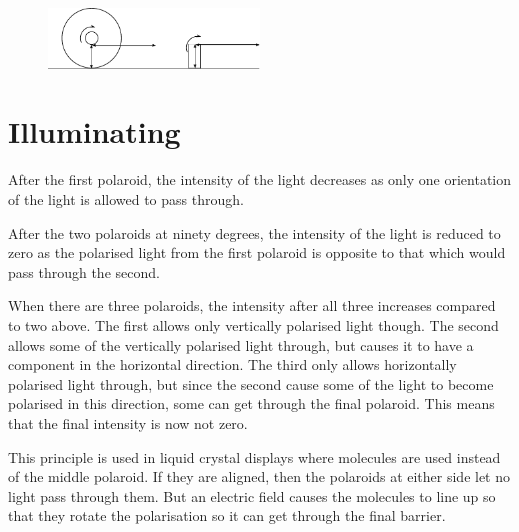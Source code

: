 	\begin{figure}[ht]
		\centering
		\includegraphics[width=0.5\textwidth]{drums_rolling_answer.pdf}
	\end{figure}

\section{Illuminating} %
	\label{sec:illuminating_ans}
	After the first polaroid, the intensity of the light decreases as only one orientation of the light is allowed to pass through.

	After the two polaroids at ninety degrees, the intensity of the light is reduced to zero as the polarised light from the first polaroid is opposite to that which would pass through the second.

	When there are three polaroids, the intensity after all three increases compared to two above. The first allows only vertically polarised light though. The second allows some of the vertically polarised light through, but causes it to have a component in the horizontal direction. The third only allows horizontally polarised light through, but since the second cause some of the light to become polarised in this direction, some can get through the final polaroid. This means that the final intensity is now not zero.

	This principle is used in liquid crystal displays where molecules are used instead of the middle polaroid. If they are aligned, then the polaroids at either side let no light pass through them. But an electric field causes the molecules to line up so that they rotate the polarisation so it can get through the final barrier.
